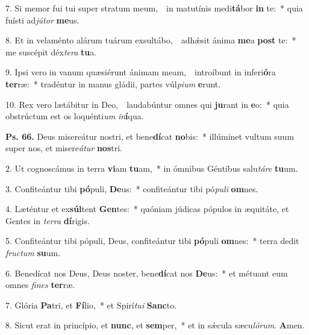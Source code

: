 7. Si memor fui tui super stratum meum,~\GreDagger\ in matutínis medi\textbf{tá}bor \textbf{in} te:~* quia fuísti ad\textit{jú}\textit{tor} \textbf{me}us.

8. Et in velaménto alárum tuárum exsultábo,~\GreDagger\ adh\'{\ae}sit ánima \textbf{me}a \textbf{post} te:~* me suscépit déx\textit{te}\textit{ra} \textbf{tu}a.

9. Ipsi vero in vanum quæsiérunt ánimam meam,~\GreDagger\ introíbunt in inferi\textbf{ó}ra \textbf{ter}ræ:~* tradéntur in manus gládii, partes vúl\textit{pi}\textit{um} \textbf{e}runt.

10. Rex vero lætábitur in Deo,~\GreDagger\ laudabúntur omnes qui \textbf{ju}rant in \textbf{e}o:~* quia obstrúctum est os loquénti\textit{um} \textit{in}\textbf{í}qua.

\textbf{Ps. 66.} Deus misereátur nostri, et bene\textbf{dí}cat \textbf{no}bis:~* illúminet vultum suum super nos, et misere\textit{á}\textit{tur} \textbf{nos}tri.

2. Ut cognoscámus in terra \textbf{vi}am \textbf{tu}am,~* in ómnibus Géntibus salu\textit{tá}\textit{re} \textbf{tu}um.

3. Confiteántur tibi \textbf{pó}puli, \textbf{De}us:~* confiteántur tibi pó\textit{pu}\textit{li} \textbf{om}nes.

4. Læténtur et ex\textbf{súl}tent \textbf{Gen}tes:~* quóniam júdicas pópulos in æquitáte, et Gentes in \textit{ter}\textit{ra} \textbf{dí}rigis.

5. Confiteántur tibi pópuli, Deus, confiteántur tibi \textbf{pó}puli \textbf{om}nes:~* terra dedit \textit{fruc}\textit{tum} \textbf{su}um.

6. Benedícat nos Deus, Deus noster, bene\textbf{dí}cat nos \textbf{De}us:~* et métuant eum omnes \textit{fi}\textit{nes} \textbf{ter}ræ.

7. Glória \textbf{Pa}tri, et \textbf{Fí}lio,~* et Spirí\textit{tu}\textit{i} \textbf{Sanc}to.

8. Sicut erat in princípio, et \textbf{nunc}, et \textbf{sem}per,~* et in s\'{\ae}cula sæcu\textit{ló}\textit{rum}. \textbf{A}men.